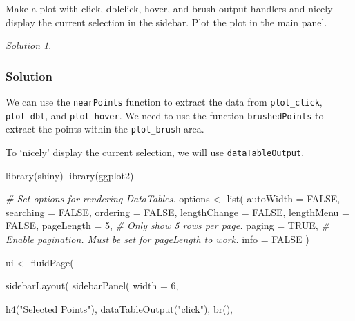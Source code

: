 \documentclass[
]{book}
\newenvironment{Shaded}{\begin{snugshade}}{\end{snugshade}}
\newcommand{\AttributeTok}[1]{\textcolor[rgb]{0.77,0.63,0.00}{#1}}
\newcommand{\CommentTok}[1]{\textcolor[rgb]{0.56,0.35,0.01}{\textit{#1}}}
\newcommand{\ConstantTok}[1]{\textcolor[rgb]{0.00,0.00,0.00}{#1}}
\newcommand{\DecValTok}[1]{\textcolor[rgb]{0.00,0.00,0.81}{#1}}
\newcommand{\FunctionTok}[1]{\textcolor[rgb]{0.00,0.00,0.00}{#1}}
\newcommand{\NormalTok}[1]{#1}
\newcommand{\OtherTok}[1]{\textcolor[rgb]{0.56,0.35,0.01}{#1}}
\newcommand{\StringTok}[1]{\textcolor[rgb]{0.31,0.60,0.02}{#1}}
\theoremstyle{definition}
\theoremstyle{definition}
\theoremstyle{definition}
\theoremstyle{definition}
\theoremstyle{remark}
\newtheorem*{solution}{Solution}
\begin{document}
Make a plot with click, dblclick, hover, and brush output handlers and nicely
display the current selection in the sidebar. Plot the plot in the main panel.

\begin{solution}
\leavevmode

\hypertarget{solution-23}{%
\subsubsection*{Solution}\label{solution-23}}

We can use the \texttt{nearPoints} function to extract the data from \texttt{plot\_click},
\texttt{plot\_dbl}, and \texttt{plot\_hover}. We need to use the function \texttt{brushedPoints} to
extract the points within the \texttt{plot\_brush} area.

To `nicely' display the current selection, we will use \texttt{dataTableOutput}.

\begin{Shaded}
\begin{Highlighting}[]
\FunctionTok{library}\NormalTok{(shiny)}
\FunctionTok{library}\NormalTok{(ggplot2)}

\CommentTok{\# Set options for rendering DataTables.}
\NormalTok{options }\OtherTok{\textless{}{-}} \FunctionTok{list}\NormalTok{(}
  \AttributeTok{autoWidth =} \ConstantTok{FALSE}\NormalTok{,}
  \AttributeTok{searching =} \ConstantTok{FALSE}\NormalTok{,}
  \AttributeTok{ordering =} \ConstantTok{FALSE}\NormalTok{,}
  \AttributeTok{lengthChange =} \ConstantTok{FALSE}\NormalTok{,}
  \AttributeTok{lengthMenu =} \ConstantTok{FALSE}\NormalTok{,}
  \AttributeTok{pageLength =} \DecValTok{5}\NormalTok{, }\CommentTok{\# Only show 5 rows per page.}
  \AttributeTok{paging =} \ConstantTok{TRUE}\NormalTok{, }\CommentTok{\# Enable pagination. Must be set for pageLength to work.}
  \AttributeTok{info =} \ConstantTok{FALSE}
\NormalTok{)}

\NormalTok{ui }\OtherTok{\textless{}{-}} \FunctionTok{fluidPage}\NormalTok{(}
  
  \FunctionTok{sidebarLayout}\NormalTok{(}
    \FunctionTok{sidebarPanel}\NormalTok{(}
      \AttributeTok{width =} \DecValTok{6}\NormalTok{,}
      
      \FunctionTok{h4}\NormalTok{(}\StringTok{"Selected Points"}\NormalTok{),}
      \FunctionTok{dataTableOutput}\NormalTok{(}\StringTok{"click"}\NormalTok{), }\FunctionTok{br}\NormalTok{(),}


\end{Highlighting}
\end{Shaded}
\end{solution}
\end{document}

